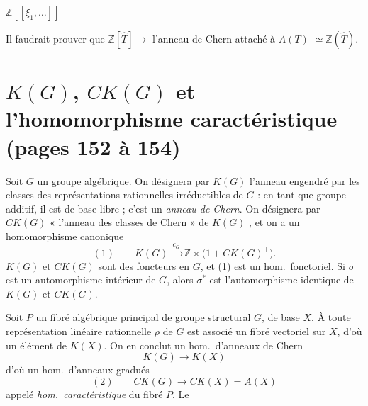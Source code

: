 \documentclass[11pt,a4paper]{article}
\begin{document}
$\mathbb{Z}[[\xi_{1}, \ldots]]$





Il faudrait prouver que $\mathbb{Z}[\hat{T}] \to$ l'anneau de Chern attaché à
$A(T)$ $\simeq \mathbb{Z}(\hat{T})$.

\section*{$K(G)$, $CK(G)$ et l'homomorphisme caractéristique (pages 152 à 154)}


Soit $G$ un groupe algébrique. On désignera par $K(G)$ l'anneau 
engendré par les classes des représentations rationnelles irréductibles de $G$ :
en tant que groupe additif, il est de base libre ; c'est un \emph{anneau de
Chern}. On désignera par $CK(G)$ « l'anneau des classes de Chern » de $K(G)$
, \struck{\ill{}} et on a un homomorphisme canonique
\[ (1) \qquad K(G) \xrightarrow{\ c_{G}\ }
   \mathbb{Z} \times \bigl( 1 + CK(G)^{+} \bigr) . \]
$K(G)$ et $CK(G)$ sont des foncteurs en $G$, et (1) est un hom.\ fonctoriel. Si
$\sigma$ est un automorphisme intérieur de $G$, alors $\sigma^{*}$ est
l'automorphisme identique de $K(G)$ et $CK(G)$.

Soit $P$ un fibré algébrique principal de groupe structural $G$, de base $X$. À
toute représentation linéaire rationnelle $\rho$ de $G$ est associé un fibré
vectoriel  sur $X$, d'où un élément de $K(X)$. On en conclut un
hom.\ d'anneaux de Chern
\[ K(G) \longrightarrow K(X) \]
d'où un hom.\ d'anneaux gradués
\[ (2) \qquad CK(G) \longrightarrow CK(X) = A(X) \]
appelé \emph{hom.\ caractéristique} du fibré $P$. Le \ill{}
\end{document}
